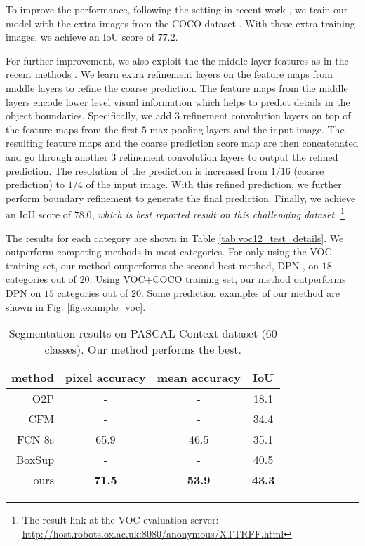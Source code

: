 To improve the performance, following the setting in recent work \cite{ChenPKMY14,Dai2015arXiv},
we train our model with the extra images from the COCO dataset \cite{lin2014microsoft}.
With these extra training images, we achieve an IoU score of $77.2$.


For further improvement, we also exploit the the middle-layer features 
as in the recent methods \cite{ChenPKMY14,LongSD14,hariharan2014hypercolumns}.
We learn extra refinement layers on the feature maps from middle layers to refine the coarse prediction.
The feature maps from the middle layers encode lower level visual information which
helps to predict details in the object boundaries.
Specifically, we add $3$ refinement convolution layers 
on top of the feature maps from the first $5$ max-pooling layers and the input image.
The resulting feature maps and the coarse prediction score map
 are then concatenated and go through another $3$ refinement convolution layers to output the refined prediction.
The resolution of the prediction is increased from $1/16$ (coarse prediction) to $1/4$ of the input image.
With this refined prediction, we further perform boundary refinement \cite{krahenbuhl2012efficient} to generate the final prediction.
Finally,  we achieve an IoU score of $78.0$, {\em which is best reported result on this challenging dataset.}
\footnote{The result link at the VOC evaluation server: \url{http://host.robots.ox.ac.uk:8080/anonymous/XTTRFF.html}}




The results for each category are shown in Table \ref{tab:voc12_test_details}.
We outperform competing methods in most categories.
For only using the VOC training set, our method outperforms the second best method, DPN \cite{LiuDPN}, 
on $18$ categories out of $20$.
Using VOC+COCO training set, our method outperforms DPN \cite{LiuDPN}
on $15$ categories out of $20$.
Some prediction examples of our method are shown in Fig. \ref{fig:example_voc}.






\begin{table}[t]
\caption{Segmentation results on PASCAL-Context dataset (60 classes).
Our method performs the best.}
\centering
\resizebox{.8\linewidth}{!}
  {
  \begin{tabular}{ r | c c c}
  method	&pixel accuracy	&mean accuracy	&IoU\\ \hline \hline
O2P \cite{carreira2012semantic}	&-	&-	&18.1\\
CFM \cite{dai2014convolutional}	&-	&-	&34.4\\
FCN-8s \cite{LongSD14}	&65.9	&46.5	&35.1\\
BoxSup \cite{Dai2015arXiv}	&-	&-	&40.5\\ \hline
ours	&\bf 71.5	&\bf 53.9	&\bf 43.3\\
 \end{tabular}
  }
\label{tab:pascalcontext}
\end{table}







